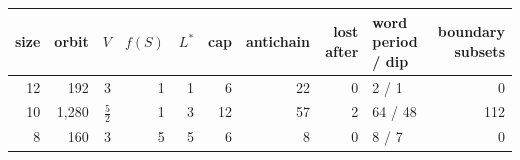 \begin{tabular}{rrrrrrrrlr}
\toprule
size & orbit & $V$ & $f(S)$ & $L^\ast$ & cap & antichain & lost after & word period / dip & boundary subsets\\
\midrule
12 & 192 & $3$ & 1 & 1 & 6 & 22 & 0 & 2 / 1 & 0\\
10 & 1{,}280 & $\tfrac{5}{2}$ & 1 & 3 & 12 & 57 & 2 & 64 / 48 & 112\\
8 & 160 & $3$ & 5 & 5 & 6 & 8 & 0 & 8 / 7 & 0\\
\bottomrule
\end{tabular}
